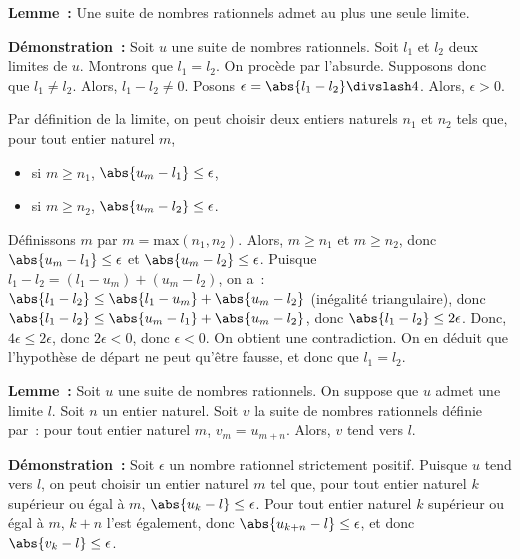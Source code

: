 \medskip

\noindent\textbf{Lemme :} Une suite de nombres rationnels admet au plus une seule limite.

\medskip

\noindent\textbf{Démonstration :} Soit $u$ une suite de nombres rationnels. 
    Soit $l_1$ et $l_2$ deux limites de $u$. 
    Montrons que $l_1 = l_2$. 
    On procède par l'absurde. 
    Supposons donc que $l_1 \neq l_2$.
    Alors, $l_1 - l_2 \neq 0$. 
    Posons $\epsilon = \abs{l_1 - l_2} \divslash 4$. 
    Alors, $\epsilon > 0$.
    
    Par définition de la limite, on peut choisir deux entiers naturels $n_1$ et $n_2$ tels que, pour tout entier naturel $m$,
    \begin{itemize}[nosep]
        \item si $m \geq n_1$, $\abs{u_m - l_1} \leq \epsilon$,
        \item si $m \geq n_2$, $\abs{u_m - l_2} \leq \epsilon$.
    \end{itemize}
    Définissons $m$ par $m = \mathrm{max}(n_1, n_2)$.
    Alors, $m \geq n_1$ et $m \geq n_2$, donc $\abs{u_m - l_1} \leq \epsilon$ et $\abs{u_m - l_2} \leq \epsilon$.
    Puisque $l_1 - l_2 = (l_1 - u_m) + (u_m - l_2)$, on a : $\abs{l_1 - l_2} \leq \abs{l_1 - u_m} + \abs{u_m - l_2}$ (inégalité triangulaire), donc $\abs{l_1 - l_2} \leq \abs{u_m - l_1} + \abs{u_m - l_2}$, donc $\abs{l_1 - l_2} \leq 2 \epsilon$.
    Donc, $4 \epsilon \leq 2 \epsilon$, donc $2 \epsilon < 0$, donc $\epsilon < 0$.
    On obtient une contradiction. 
    On en déduit que l'hypothèse de départ ne peut qu'être fausse, et donc que $l_1 = l_2$.

    \done

\medskip

\medskip

\noindent\textbf{Lemme :} Soit $u$ une suite de nombres rationnels. 
    On suppose que $u$ admet une limite $l$. 
    Soit $n$ un entier naturel. 
    Soit $v$ la suite de nombres rationnels définie par : pour tout entier naturel $m$, $v_m = u_{m+n}$.
    Alors, $v$ tend vers $l$.

\medskip

\noindent\textbf{Démonstration :} Soit $\epsilon$ un nombre rationnel strictement positif.
    Puisque $u$ tend vers $l$, on peut choisir un entier naturel $m$ tel que, pour tout entier naturel $k$ supérieur ou égal à $m$, $\abs{u_k - l} \leq \epsilon$.
    Pour tout entier naturel $k$ supérieur ou égal à $m$, $k + n$ l'est également, donc $\abs{u_{k+n} - l} \leq \epsilon$, et donc $\abs{v_k - l} \leq \epsilon$.

